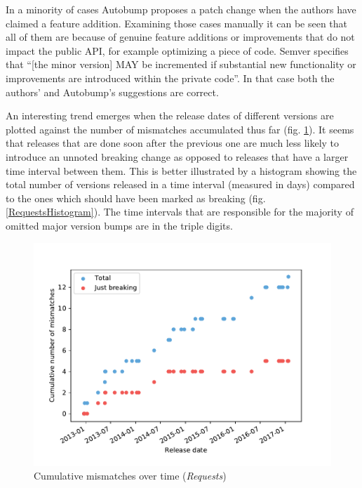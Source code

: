 \documentclass{l4proj}
\begin{document}
In a minority of cases Autobump proposes a patch change when the
authors have claimed a feature addition. Examining those cases
manually it can be seen that all of them are because of genuine
feature additions or improvements that do not impact the public API,
for example optimizing a piece of code. Semver specifies that ``[the
minor version] MAY be incremented if substantial new functionality or
improvements are introduced within the private code''. In that case
both the authors' and Autobump's suggestions are correct.

An interesting trend emerges when the release dates of different
versions are plotted against the number of mismatches accumulated thus
far (fig. \ref{RequestsCumulativeMismatches}). It seems that releases
that are done soon after the previous one are much less likely to
introduce an unnoted breaking change as opposed to releases that have
a larger time interval between them. This is better illustrated by a
histogram showing the total number of versions released in a time
interval (measured in days) compared to the ones which should have
been marked as breaking (fig. \ref{RequestsHistogram}). The time
intervals that are responsible for the majority of omitted major
version bumps are in the triple digits.

\begin{figure}[]
\centering
\includegraphics[height=0.4\textheight]{images/evaluation/requests_cumulative_mismatches}
\caption{Cumulative mismatches over time (\textit{Requests})}
\label{RequestsCumulativeMismatches}
\end{figure}
\end{document}
